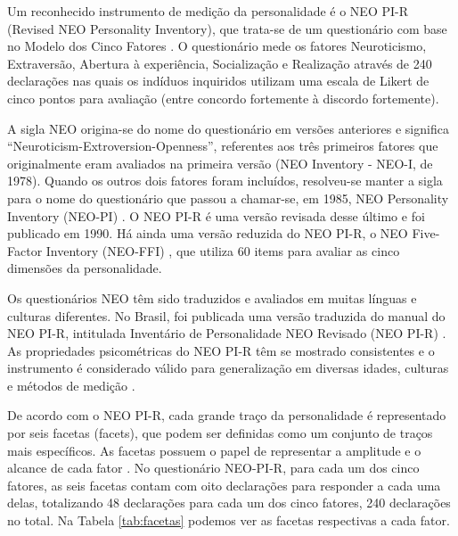 
Um reconhecido instrumento de medição da personalidade é o NEO PI-R (Revised NEO Personality Inventory), que trata-se de um questionário com base no Modelo dos Cinco Fatores \cite{costa:92a}. O questionário mede os fatores Neuroticismo, Extraversão, Abertura à experiência, Socialização e Realização através de 240 declarações nas quais os indíduos inquiridos utilizam uma escala de Likert de cinco pontos para avaliação (entre concordo fortemente à discordo fortemente).

A sigla NEO origina-se do nome do questionário em versões anteriores e significa ``Neuroticism-Extroversion-Openness'', referentes aos três primeiros fatores que originalmente eram avaliados na primeira versão (NEO Inventory - NEO-I, de 1978). Quando os outros dois fatores foram incluídos, resolveu-se manter a sigla para o nome do questionário que passou a chamar-se, em 1985, NEO Personality Inventory (NEO-PI) \cite{costa:85}. O NEO PI-R é uma versão revisada desse último e foi publicado em 1990. Há ainda uma versão reduzida do NEO PI-R, o NEO Five-Factor Inventory (NEO-FFI) \cite{costa:92b}, que utiliza 60 items para avaliar as cinco dimensões da personalidade.

Os questionários NEO têm sido traduzidos e avaliados em muitas línguas e culturas diferentes. No Brasil, foi publicada uma versão traduzida do manual do NEO PI-R, intitulada Inventário de Personalidade NEO Revisado (NEO PI-R) \cite{flores:07}. As propriedades psicométricas do NEO PI-R têm se mostrado consistentes e o instrumento é considerado válido para generalização em diversas idades, culturas e métodos de medição \cite{mccrae:11}.

De acordo com o NEO PI-R, cada grande traço da personalidade é representado por seis facetas (facets), que podem ser definidas como um conjunto de traços mais específicos. As facetas possuem o papel de representar a amplitude e o alcance de cada fator \cite{mccrae:06}. No questionário NEO-PI-R, para cada um dos cinco fatores, as seis facetas contam com oito declarações para responder a cada uma delas, totalizando 48 declarações para cada um dos cinco fatores, 240 declarações no total. Na Tabela \ref{tab:facetas} podemos ver as facetas respectivas a cada fator.

